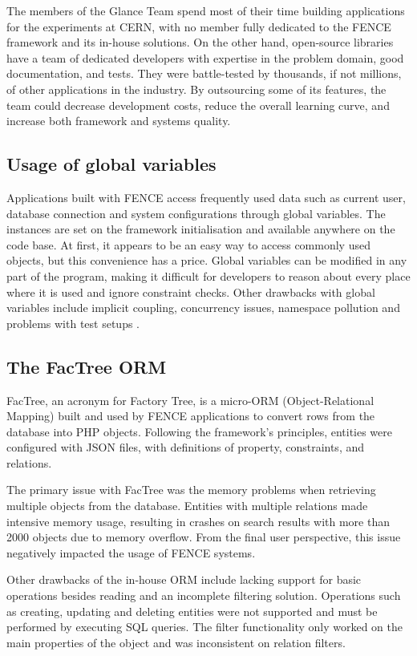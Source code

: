The members of the Glance Team spend most of their time building applications for the experiments at CERN, with no member fully dedicated to the FENCE framework and its in-house solutions. On the other hand, open-source libraries have a team of dedicated developers with expertise in the problem domain, good documentation, and tests. They were battle-tested by thousands, if not millions, of other applications in the industry. By outsourcing some of its features, the team could decrease development costs, reduce the overall learning curve, and increase both framework and systems quality.

\subsection{Usage of global variables}
\label{sec:global-variables}

Applications built with FENCE access frequently used data such as current user, database connection and system configurations through global variables. The instances are set on the framework initialisation and available anywhere on the code base. At first, it appears to be an easy way to access commonly used objects, but this convenience has a price. Global variables can be modified in any part of the program, making it difficult for developers to reason about every place where it is used and ignore constraint checks. Other drawbacks with global variables include implicit coupling, concurrency issues, namespace pollution and problems with test setups \cite{rishikesh}.

\subsection{The FacTree ORM}

FacTree, an acronym for Factory Tree, is a micro-ORM (Object-Relational Mapping) built and used by FENCE applications to convert rows from the database into PHP objects. Following the framework's principles, entities were configured with JSON files, with definitions of property, constraints, and relations.

The primary issue with FacTree was the memory problems when retrieving multiple objects from the database. Entities with multiple relations made intensive memory usage, resulting in crashes on search results with more than 2000 objects due to memory overflow. From the final user perspective, this issue negatively impacted the usage of FENCE systems.

Other drawbacks of the in-house ORM include lacking support for basic operations besides reading and an incomplete filtering solution. Operations such as creating, updating and deleting entities were not supported and must be performed by executing SQL queries. The filter functionality only worked on the main properties of the object and was inconsistent on relation filters.

